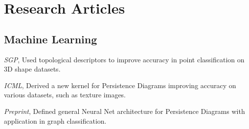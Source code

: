 \documentclass[11pt,a4paper]{moderncv}
\begin{document}
	\section{Research Articles}

	\subsection{Machine Learning}

			  {\small\textit{SGP}, }
                          {}{}{\footnotesize Used topological descriptors to improve accuracy in point classification on 3D shape datasets.}

                          {\small\textit{ICML}, }
			  {}{}{\footnotesize Derived a new kernel for Persistence Diagrams improving accuracy on various datasets, such as texture images. }


                          {\small\textit{Preprint}, }
                          {}{}{\footnotesize Defined general Neural Net architecture for Persistence Diagrams with application in graph classification.}
\end{document}
